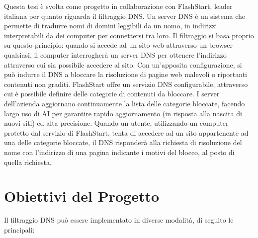 \documentclass[12pt,a4paper,openright,twoside]{book}
\begin{document}
Questa tesi è svolta come progetto in collaborazione con FlashStart, leader italiana per quanto riguarda il filtraggio \gls{DNS}.
Un server \gls{DNS} è un sistema che permette di tradurre nomi di domini leggibili da un uomo, in indirizzi interpretabili da dei computer per connettersi tra loro.
Il filtraggio si basa proprio su questo principio: quando si accede ad un sito web attraverso un browser qualsiasi, il computer interrogherà un server \gls{DNS} per ottenere l'indirizzo attraverso cui sia possibile accedere al sito.
Con un'apposita configurazione, si può indurre il \gls{DNS} a bloccare la risoluzione di pagine web malevoli o riportanti contenuti non graditi.
FlashStart offre un servizio \gls{DNS} configurabile, attraverso cui è possibile definire delle categorie di contenuti da bloccare.
I server dell'azienda aggiornano continuamente la lista delle categorie bloccate, facendo largo uso di \gls{AI} per garantire rapido aggiornamento (in risposta alla nascita di nuovi siti) ed alta precisione.
Quando un utente, utilizzando un computer protetto dal servizio di FlashStart, tenta di accedere ad un sito appartenente ad una delle categorie bloccate, il \gls{DNS} risponderà alla richiesta di risoluzione del nome con l'indirizzo di una pagina indicante i motivi del blocco, al posto di quella richiesta.

\section{Obiettivi del Progetto}
\label{sec:obiettivi-progetto}

Il filtraggio \gls{DNS} può essere implementato in diverse modalità, di seguito le principali:
\end{document}
